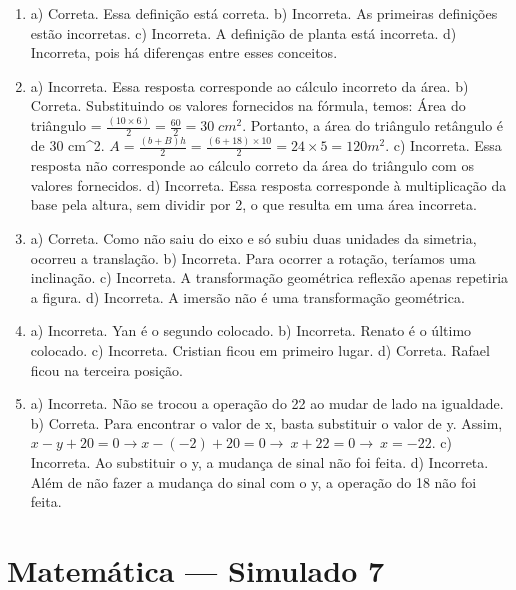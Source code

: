 \begin{enumerate}
\item a) Correta. Essa definição está correta.
b) Incorreta. As primeiras definições estão incorretas.
c) Incorreta. A definição de planta está incorreta.
d) Incorreta, pois há diferenças entre esses conceitos.


\item a) Incorreta. Essa resposta corresponde ao cálculo incorreto da área.
b) Correta. Substituindo os valores fornecidos na fórmula, temos:
Área do triângulo = $\frac {(10 \times 6)}{2} = \frac {60}{2} =
30 \;cm^2$. Portanto, a área do triângulo retângulo é de 30 cm^2.
$A = \frac{\left( b + B \right)h}{2} = \frac{(6 + 18) \times 10}{2} = 24 \times 5 = 120m^2$.
c) Incorreta. Essa resposta não corresponde ao cálculo correto da área do triângulo com os valores fornecidos.
d) Incorreta. Essa resposta corresponde à multiplicação da base pela altura, sem dividir por 2, o que resulta em uma área incorreta.

\item a) Correta. Como não saiu do eixo e só subiu duas unidades da simetria, ocorreu a translação.
b) Incorreta. Para ocorrer a rotação, teríamos uma inclinação.
c) Incorreta. A transformação geométrica reflexão apenas repetiria a figura.
d) Incorreta. A imersão não é uma transformação geométrica.

\item a) Incorreta. Yan é o segundo colocado.
b) Incorreta. Renato é o último colocado.
c) Incorreta. Cristian ficou em primeiro lugar.
d) Correta. Rafael ficou na terceira posição.


\item a) Incorreta. Não se trocou a operação do 22 ao mudar de lado na igualdade.
b) Correta. Para encontrar o valor de x, basta substituir o valor
de y. Assim, $x - y + 20 = 0 \rightarrow x - ( - 2) + 20 = 0 \rightarrow \ x + 22 = 0 \rightarrow \ x = - 22$.
c) Incorreta. Ao substituir o y, a mudança de sinal não foi feita.
d) Incorreta. Além de não fazer a mudança do sinal com o y, a operação do 18 não foi feita.
\end{enumerate}

\section*{Matemática — Simulado 7} 

